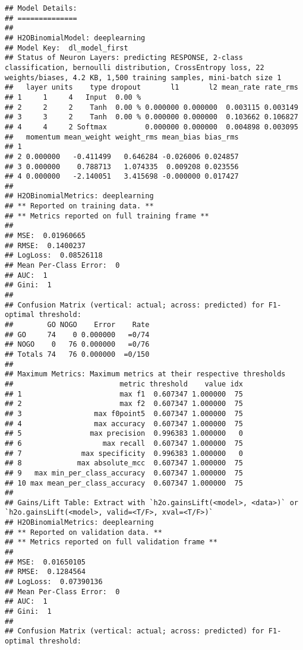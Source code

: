\documentclass[]{article}
\begin{document}
\begin{verbatim}
## Model Details:
## ==============
## 
## H2OBinomialModel: deeplearning
## Model Key:  dl_model_first 
## Status of Neuron Layers: predicting RESPONSE, 2-class classification, bernoulli distribution, CrossEntropy loss, 22 weights/biases, 4.2 KB, 1,500 training samples, mini-batch size 1
##   layer units    type dropout       l1       l2 mean_rate rate_rms
## 1     1     4   Input  0.00 %                                     
## 2     2     2    Tanh  0.00 % 0.000000 0.000000  0.003115 0.003149
## 3     3     2    Tanh  0.00 % 0.000000 0.000000  0.103662 0.106827
## 4     4     2 Softmax         0.000000 0.000000  0.004898 0.003095
##   momentum mean_weight weight_rms mean_bias bias_rms
## 1                                                   
## 2 0.000000   -0.411499   0.646284 -0.026006 0.024857
## 3 0.000000    0.788713   1.074335  0.009208 0.023556
## 4 0.000000   -2.140051   3.415698 -0.000000 0.017427
## 
## H2OBinomialMetrics: deeplearning
## ** Reported on training data. **
## ** Metrics reported on full training frame **
## 
## MSE:  0.01960665
## RMSE:  0.1400237
## LogLoss:  0.08526118
## Mean Per-Class Error:  0
## AUC:  1
## Gini:  1
## 
## Confusion Matrix (vertical: actual; across: predicted) for F1-optimal threshold:
##        GO NOGO    Error    Rate
## GO     74    0 0.000000   =0/74
## NOGO    0   76 0.000000   =0/76
## Totals 74   76 0.000000  =0/150
## 
## Maximum Metrics: Maximum metrics at their respective thresholds
##                         metric threshold    value idx
## 1                       max f1  0.607347 1.000000  75
## 2                       max f2  0.607347 1.000000  75
## 3                 max f0point5  0.607347 1.000000  75
## 4                 max accuracy  0.607347 1.000000  75
## 5                max precision  0.996383 1.000000   0
## 6                   max recall  0.607347 1.000000  75
## 7              max specificity  0.996383 1.000000   0
## 8             max absolute_mcc  0.607347 1.000000  75
## 9   max min_per_class_accuracy  0.607347 1.000000  75
## 10 max mean_per_class_accuracy  0.607347 1.000000  75
## 
## Gains/Lift Table: Extract with `h2o.gainsLift(<model>, <data>)` or `h2o.gainsLift(<model>, valid=<T/F>, xval=<T/F>)`
## H2OBinomialMetrics: deeplearning
## ** Reported on validation data. **
## ** Metrics reported on full validation frame **
## 
## MSE:  0.01650105
## RMSE:  0.1284564
## LogLoss:  0.07390136
## Mean Per-Class Error:  0
## AUC:  1
## Gini:  1
## 
## Confusion Matrix (vertical: actual; across: predicted) for F1-optimal threshold:

\end{verbatim}
\end{document}
